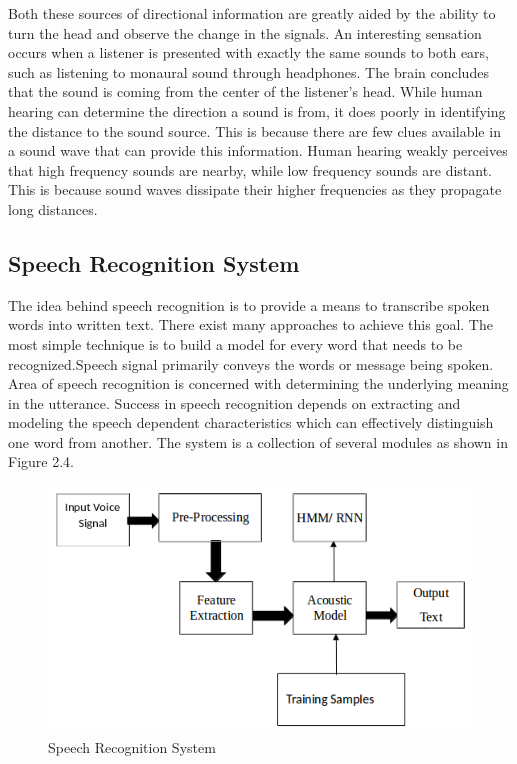Both these sources of directional information are greatly aided by the ability to turn the head and observe the change in the signals. An interesting sensation occurs when a listener is presented with exactly the same sounds to both ears, such as listening to monaural sound through headphones. The brain concludes that the sound is coming from the center of the listener's head.
While human hearing can determine the direction a sound is from, it does poorly in identifying the distance to the sound source. This is because there are few clues available in a sound wave that can provide this information. Human hearing weakly perceives that high frequency sounds are nearby, while low frequency sounds are distant. This is because sound waves dissipate their higher frequencies as they propagate long distances. 







\subsection{Speech Recognition System}
The idea behind speech recognition is to provide a means to
transcribe spoken words into written text. There exist many approaches to achieve this goal. The most simple technique is to build a model for every word that needs to be recognized.Speech signal primarily conveys the words or message being spoken. Area of speech recognition is concerned with determining the underlying meaning in the utterance. Success in speech recognition depends on extracting and modeling the speech dependent characteristics which can effectively distinguish one word from another. The system is a collection of several modules as shown in Figure 2.4.
\begin{figure}
	\begin{center}
		\includegraphics[scale = 0.8]{images/ASR.png}
		\caption{Speech Recognition System}
	\end{center}
\end{figure}

